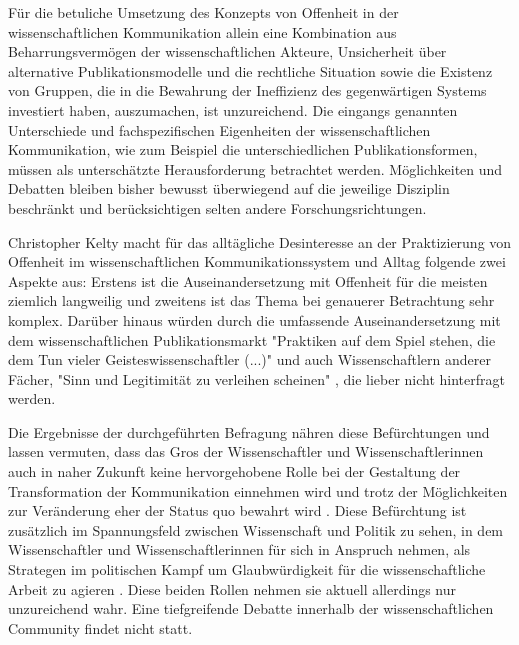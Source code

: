 Für die betuliche Umsetzung des Konzepts von Offenheit in der wissenschaftlichen Kommunikation allein eine Kombination aus Beharrungsvermögen der wissenschaftlichen Akteure, Unsicherheit über alternative Publikationsmodelle und die rechtliche Situation sowie die Existenz von Gruppen, die in die Bewahrung der Ineffizienz des gegenwärtigen Systems investiert haben, auszumachen, ist unzureichend. Die eingangs genannten Unterschiede und fachspezifischen Eigenheiten der wissenschaftlichen Kommunikation, wie zum Beispiel die unterschiedlichen Publikationsformen, müssen als unterschätzte Herausforderung betrachtet werden. Möglichkeiten und Debatten bleiben bisher bewusst überwiegend auf die jeweilige Disziplin beschränkt und berücksichtigen selten andere Forschungsrichtungen.

Christopher Kelty macht für das alltägliche Desinteresse an der Praktizierung von Offenheit im wissenschaftlichen Kommunikationssystem und Alltag folgende zwei Aspekte aus: Erstens ist die Auseinandersetzung mit Offenheit für die meisten ziemlich langweilig und zweitens ist das Thema bei genauerer Betrachtung sehr komplex. Darüber hinaus würden durch die umfassende Auseinandersetzung mit dem wissenschaftlichen Publikationsmarkt "Praktiken auf dem Spiel stehen, die dem Tun vieler Geisteswissenschaftler (...)" und auch Wissenschaftlern anderer Fächer, "Sinn und Legitimität zu verleihen scheinen" \cite[:6]{Hirschi_2015}, die lieber nicht hinterfragt werden.

Die Ergebnisse der durchgeführten Befragung nähren diese Befürchtungen und lassen vermuten, dass das Gros der Wissenschaftler und Wissenschaftlerinnen auch in naher Zukunft keine hervorgehobene Rolle bei der Gestaltung der Transformation der Kommunikation einnehmen wird und trotz der Möglichkeiten zur Veränderung eher der Status quo bewahrt wird \cite{Nosek_2012}. Diese Befürchtung ist zusätzlich im Spannungsfeld zwischen Wissenschaft und Politik zu sehen, in dem Wissenschaftler und Wissenschaftlerinnen für sich in Anspruch nehmen, als Strategen im politischen Kampf um Glaubwürdigkeit für die wissenschaftliche Arbeit zu agieren \cite{Latour_2013}. Diese beiden Rollen nehmen sie aktuell allerdings nur unzureichend wahr. Eine tiefgreifende Debatte innerhalb der wissenschaftlichen Community findet nicht statt.

